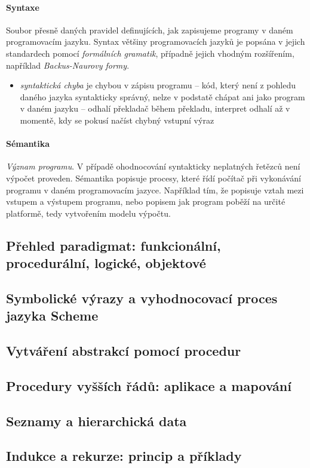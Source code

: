 \documentclass[10pt,a4paper]{article}
\begin{document}
    \paragraph{Syntaxe}
    Soubor přesně daných pravidel definujících, jak zapisujeme programy v daném programovacím jazyku. Syntax většiny programovacích jazyků je popsána v jejich standardech pomocí \textit{formálních gramatik}, případně jejich vhodným rozšířením, například \textit{Backus-Naurovy formy}.
    \begin{itemize}
      \item \textit{syntaktická chyba} je chybou v zápisu programu -- kód, který není z pohledu daného jazyka syntakticky správný, nelze v podstatě chápat ani jako program v daném jazyku -- odhalí překladač během překladu, interpret odhalí až v momentě, kdy se pokusí načíst chybný vstupní výraz
    \end{itemize}
    \paragraph{Sémantika}
      \textit{Význam programu}. V případě ohodnocování syntakticky neplatných řetězců není výpočet proveden. Sémantika popisuje procesy, které řídí počítač při vykonávání programu v daném programovacím jazyce. Například tím, že popisuje vztah mezi vstupem a výstupem programu, nebo popisem jak program poběží na určité platformě, tedy vytvořením modelu výpočtu.
  \subsection{Přehled paradigmat: funkcionální, procedurální, logické, objektové}
  \subsection{Symbolické výrazy a vyhodnocovací proces jazyka Scheme}
  \subsection{Vytváření abstrakcí pomocí procedur}
  \subsection{Procedury vyšších řádů: aplikace a mapování}
  \subsection{Seznamy a hierarchická data}
  \subsection{Indukce a rekurze: princip a příklady}
\end{document}
